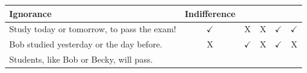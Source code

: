 \documentclass[oneside]{report}
\theoremstyle{definition}
\theoremstyle{definition}
\theoremstyle{definition}
\theoremstyle{remark}
\begin{document}
\begin{longtable}[]{@{}lccccc@{}}
\begin{minipage}[b]{0.12\columnwidth}
Ignorance\strut
\end{minipage} & \begin{minipage}[b]{0.12\columnwidth}\centering\strut
Indifference\strut
\end{minipage}\tabularnewline
\midrule
\endhead
\begin{minipage}[t]{0.45\columnwidth}\raggedright\strut
Study today or tomorrow, to pass the exam!\strut
\end{minipage} & \begin{minipage}[t]{0.05\columnwidth}\centering\strut
\(\checkmark\)\strut
\end{minipage} & \begin{minipage}[t]{0.05\columnwidth}\centering\strut
X\strut
\end{minipage} & \begin{minipage}[t]{0.05\columnwidth}\centering\strut
X\strut
\end{minipage} & \begin{minipage}[t]{0.12\columnwidth}\centering\strut
\(\checkmark\)\strut
\end{minipage} & \begin{minipage}[t]{0.12\columnwidth}\centering\strut
\(\checkmark\)\strut
\end{minipage}\tabularnewline
\begin{minipage}[t]{0.45\columnwidth}\raggedright\strut
Bob studied yesterday or the day before.\strut
\end{minipage} & \begin{minipage}[t]{0.05\columnwidth}\centering\strut
X\strut
\end{minipage} & \begin{minipage}[t]{0.05\columnwidth}\centering\strut
\(\checkmark\)\strut
\end{minipage} & \begin{minipage}[t]{0.05\columnwidth}\centering\strut
X\strut
\end{minipage} & \begin{minipage}[t]{0.12\columnwidth}\centering\strut
\(\checkmark\)\strut
\end{minipage} & \begin{minipage}[t]{0.12\columnwidth}\centering\strut
X\strut
\end{minipage}\tabularnewline
\begin{minipage}[t]{0.45\columnwidth}\raggedright\strut
Students, like Bob or Becky, will pass.\strut
\end{minipage} & \begin{minipage}[t]{0.05\columnwidth}\centering\strut

\end{minipage}
\end{longtable}
\end{document}
